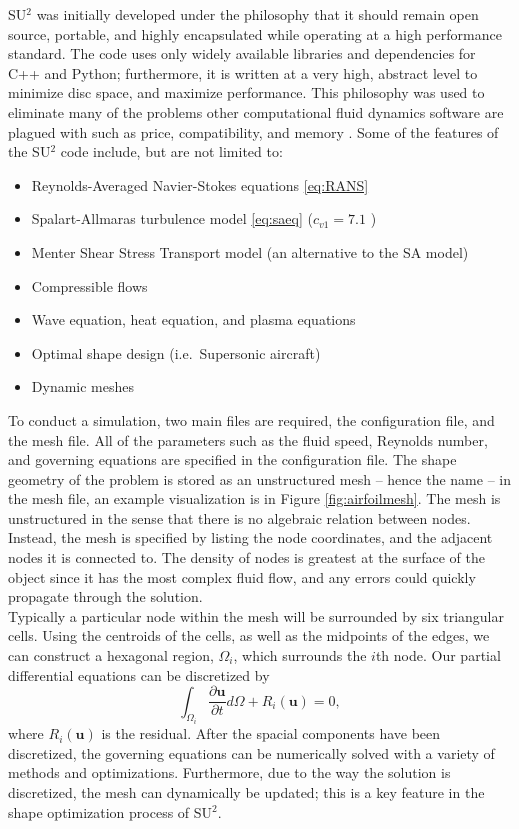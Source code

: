 \documentclass[10pt, titlepage]{article}
\begin{document}
SU$^2$ was initially developed under the philosophy that it should remain open source, portable, and highly encapsulated while operating at a high performance standard. The code uses only widely available libraries and dependencies for C++ and Python; furthermore, it is written at a very high, abstract level to minimize disc space, and maximize performance. This philosophy was used to eliminate many of the problems other computational fluid dynamics software are plagued with such as price, compatibility, and memory  \cite{su2main}. Some of the features of the SU$^2$ code include, but are not limited to:
\begin{itemize}
\item Reynolds-Averaged Navier-Stokes equations \eqref{eq:RANS}
\item Spalart-Allmaras turbulence model \eqref{eq:saeq} ($c_{v1} = 7.1$ \cite{su2main} \cite{su2two})
\item Menter Shear Stress Transport model (an alternative to the SA model)
\item Compressible flows
\item Wave equation, heat equation, and plasma equations
\item Optimal shape design (i.e.\ Supersonic aircraft)
\item Dynamic meshes \\
\end{itemize}

To conduct a simulation, two main files are required, the configuration file, and the mesh file. All of the parameters such as the fluid speed, Reynolds number, and governing equations are specified in the configuration file. The shape geometry of the problem is stored as an unstructured mesh -- hence the name -- in the mesh file, an example visualization is in Figure \ref{fig:airfoilmesh}. The mesh is unstructured in the sense that there is no algebraic relation between nodes. Instead, the mesh is specified by listing the node coordinates, and the adjacent nodes it is connected to. The density of nodes is greatest at the surface of the object since it has the most complex fluid flow, and any errors could quickly propagate through the solution. \\

Typically a particular node within the mesh will be surrounded by six triangular cells. Using the centroids of the cells, as well as the midpoints of the edges, we can construct a hexagonal region, $\Omega_i$, which surrounds the $i$th node. Our partial differential equations can be discretized by 
\begin{equation*}
\int_{\Omega_i} \frac{\partial \mathbf{u}}{\partial t} d\Omega + R_i(\mathbf{u}) = 0,
\end{equation*}
where $R_i(\mathbf{u})$ is the residual. After the spacial components have been discretized, the governing equations can be numerically solved with a variety of methods and optimizations. Furthermore, due to the way the solution is discretized, the mesh can dynamically be updated; this is a key feature in the shape optimization process of SU$^2$.
\end{document}
